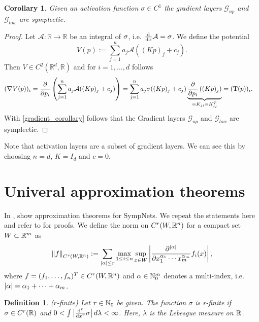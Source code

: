 \documentclass[twoside,a4paper]{article}
\newtheorem{definition}{Definition}
\newtheorem{corollary}{Corollary}
\begin{document}
\begin{corollary}
	Given an activation function $\sigma \in C^1$ the gradient layers $\mathcal{G}_{up}$
	and $\mathcal{G}_{low}$ are symplectic.
\end{corollary}
\begin{proof}
	Let $\mathcal{A}: \mathbb{R} \to \mathbb{R}$ be an integral of $\sigma$, 
	i.e. $\frac{\mathrm{d}^{}}{\mathrm{d}x} \mathcal{A} = \sigma$. We define the potential
	\begin{equation*}
		V(p) := \sum_{j=1}^n a_j \mathcal{A}((Kp)_j + c_j)
		.
	\end{equation*}
	Then $V \in C^2(\mathbb{R}^d, \mathbb{R})$ and for $i=1, \dots, d$ follows
	\begin{align*}
		(\nabla_{}{V(p)})_i &= \frac{\partial }{\partial p_i} \left( \sum_{j=1}^n a_j \mathcal{A}((Kp)_j + c_j) \right)
		= \sum_{j=1}^n a_j \sigma((Kp)_j + c_j) 
		\underbrace{\frac{\partial }{\partial p_i} \left( (Kp)_j \right)}_{=K_{ji} = K^T_{ij}}
		= (\mathrm{T}(p))_i
		.
	\end{align*}
	With \cref{gradient_corollary} follows that the Gradient layers
	$\mathcal{G}_{up}$ and $\mathcal{G}_{low}$ are symplectic.
\end{proof}

Note that activation layers are a subset of gradient layers. We can see this by choosing
$n=d$, $K=I_d$ and $c=0$.

\section{Univeral approximation theorems}\label{sec_unv_approx_theorem}

In \cite{Jin2020}, \citeauthor{Jin2020} show approximation theorems for SympNets.
We repeat the statements here and refer to \cite{Jin2020} for proofs.
We define the norm on $C^r(W, \mathbb{R}^n)$ for a compact set $W \subset \mathbb{R}^m$ as
\begin{equation*}
	\left\lVert{f}\right\rVert_{C^r(W,\mathbb{R}^n)} := \sum_{\left|{\alpha}\right| \leq r}
	\max_{1 \leq i \leq n} \sup_{x \in W}
	\left|{\frac{\partial^{\left|{\alpha}\right|}}{\partial x_1^{\alpha_1} \cdots x_m^{\alpha_m}} 
	f_i(x)}\right|
	,
\end{equation*}
where $f = (f_1, \dots, f_n)^T \in C^r(W,\mathbb{R}^n)$ and $\alpha \in \mathbb{N}_0^m$ denotes a multi-index, i.e. 
$\left|{\alpha}\right| = \alpha_1 + \cdots + \alpha_m$.

\begin{definition}
	($r$-finite)
	Let $r \in \mathbb{N}_0$ be given. The function $\sigma$ is r-finite if $\sigma \in C^r(\mathbb{R})$
	and $0 < \int \left|{\frac{\mathrm{d}^r}{\mathrm{d}x^r} \sigma}\right| d\lambda < \infty$. Here,
	$\lambda$ is the Lebesgue measure on $\mathbb{R}$.
\end{definition}
\end{document}
